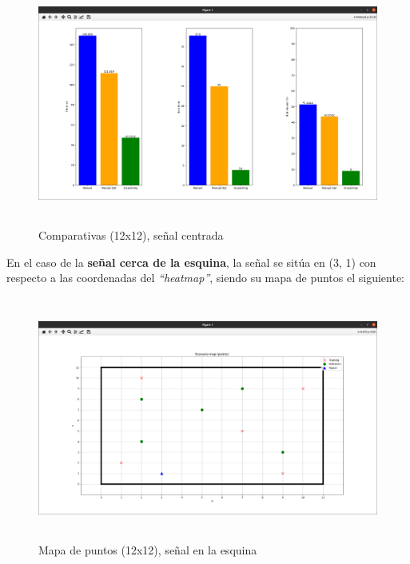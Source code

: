 \begin{figure} [H]
    \begin{center}
    \includegraphics[height=8cm]{imagenes/cap4/18_comp_centro_12.png}
    \end{center}
    \caption[Comparativas (12x12), señal centrada]{Comparativas (12x12), señal centrada}
    \label{fig:comp_center_12}
\end{figure}

En el caso de la \textbf{señal cerca de la esquina}, la señal se sitúa en (3, 1) con respecto a las coordenadas del \emph{``heatmap''}, siendo su mapa de puntos el siguiente:

\begin{figure} [H]
    \begin{center}
    \includegraphics[height=8cm]{imagenes/cap4/19_mapa_p_esq_12.png}
    \end{center}
    \caption[Mapa de puntos (12x12), señal en la esquina]{Mapa de puntos (12x12), señal en la esquina}
    \label{fig:map_p_esq_12}
\end{figure}

